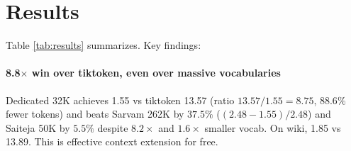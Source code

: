 \documentclass[conference]{IEEEtran}
\begin{document}
\section{Results}

\begin{table}[t]
\centering
\scriptsize
\setlength{\tabcolsep}{3pt}
\caption{Telugu TokEval results sorted by Telugu FLORES fertility (lower better). TE-wiki = 2K real wiki sample (harder). Embedding for 1.7B, hidden 2048, BF16.}
\label{tab:results}
\end{table}

Table \ref{tab:results} summarizes. Key findings:

\paragraph{8.8$\times$ win over tiktoken, even over massive vocabularies} Dedicated 32K achieves 1.55 vs tiktoken 13.57 (ratio $13.57/1.55=8.75$, $88.6\%$ fewer tokens) and beats Sarvam 262K by $37.5\%$ ($(2.48-1.55)/2.48$) and Saiteja 50K by $5.5\%$ despite $8.2\times$ and $1.6\times$ smaller vocab. On wiki, 1.85 vs 13.89. This is effective context extension for free.
\end{document}
